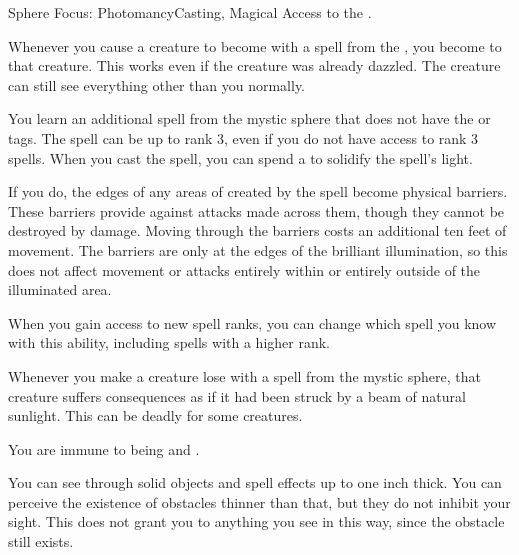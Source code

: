   \begin{magicalfeat}{Sphere Focus: Photomancy}{Casting, Magical}
    \featpre Access to the  .

     Whenever you cause a creature to become \dazzled with a spell from the  , you  become  to that creature.
    This works even if the creature was already dazzled.
    The creature can still see everything other than you normally.

     You learn an additional spell from the  mystic sphere that does not have the  or  tags.
    The spell can be up to rank 3, even if you do not have access to rank 3 spells.
    When you cast the spell, you can spend a  to solidify the spell's light.

    If you do, the edges of any areas of  created by the spell become physical barriers.
    These barriers provide  against attacks made across them, though they cannot be destroyed by damage.
    Moving through the barriers costs an additional ten feet of movement.
    The barriers are only at the edges of the brilliant illumination, so this does not affect movement or attacks entirely within or entirely outside of the illuminated area.

    When you gain access to new spell ranks, you can change which spell you know with this ability, including spells with a higher rank.

     Whenever you make a creature lose  with a spell from the  mystic sphere, that creature suffers consequences as if it had been struck by a beam of natural sunlight.
    This can be deadly for some creatures.

     You are immune to being \dazzled and \blinded.

     You can see through solid objects and spell effects up to one inch thick.
    You can perceive the existence of obstacles thinner than that, but they do not inhibit your sight.
    This does not grant you  to anything you see in this way, since the obstacle still exists.
  \end{magicalfeat}

